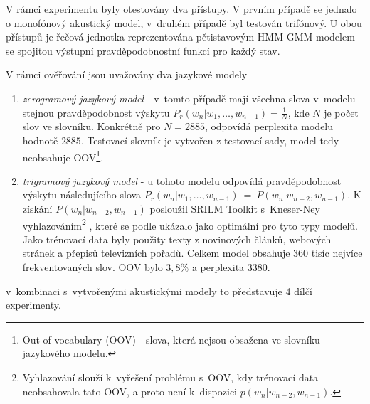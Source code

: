 V rámci experimentu byly otestovány dva přístupy.
V prvním případě se jednalo o monofónový akustický model, v~druhém případě byl testován trifónový.
U obou přístupů je řečová jednotka reprezentována pětistavovým HMM-GMM modelem se spojitou výstupní pravděpodobnostní funkcí pro každý stav.

V rámci ověřování jsou uvažovány dva jazykové modely

\begin{enumerate}
  \item \textit{zerogramový jazykový model} - v~tomto případě mají všechna slova v~modelu stejnou pravděpodobnost výskytu $P_r(w_n|w_1,\dots,w_{n-1}) = \frac{1}{N}$, kde $N$ je počet slov ve slovníku. Konkrétně pro $N = 2885$, odpovídá perplexita modelu hodnotě $2885$. Testovací slovník je vytvořen z testovací sady, model tedy neobsahuje OOV\footnote{Out-of-vocabulary (OOV) - slova, která nejsou obsažena ve slovníku jazykového modelu.}.
  \item \textit{trigramový jazykový model} - u tohoto modelu odpovídá pravděpodobnost výskytu následujícího slova $P_r(w_n|w_1,\dots,w_{n-1})~=~P(w_n|w_{n-2}, w_{n-1})$. K získání $P(w_n|w_{n-2}, w_{n-1})$ posloužil SRILM Toolkit s~Kneser-Ney vyhlazováním\footnote{Vyhlazování slouží  k~vyřešení problému s~OOV, kdy trénovací data neobsahovala tato OOV, a proto není  k~dispozici $p(w_n|w_{n-2}, w_{n-1})$.} \cite{Stolcke2002}, které se podle \cite{Prazak2008} ukázalo jako optimální pro tyto typy modelů. Jako trénovací data byly použity texty z novinových článků, webových stránek a přepisů televizních pořadů. Celkem model obsahuje 360 tisíc nejvíce frekventovaných slov. OOV bylo $3,8 \%$ a perplexita $3380$.
\end{enumerate}

\noindent v~kombinaci s~vytvořenými akustickými modely to představuje 4 dílčí experimenty.


